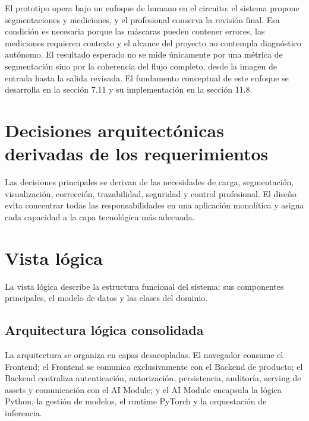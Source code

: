 
El prototipo opera bajo un enfoque de humano en el circuito: el sistema propone segmentaciones y mediciones, y el profesional conserva la revisión final. Esa condición es necesaria porque las máscaras pueden contener errores, las mediciones requieren contexto y el alcance del proyecto no contempla diagnóstico autónomo. El resultado esperado no se mide únicamente por una métrica de segmentación sino por la coherencia del flujo completo, desde la imagen de entrada hasta la salida revisada. El fundamento conceptual de este enfoque se desarrolla en la sección 7.11 y su implementación en la sección 11.8.

\section{Decisiones arquitectónicas derivadas de los requerimientos}

Las decisiones principales se derivan de las necesidades de carga, segmentación, visualización, corrección, trazabilidad, seguridad y control profesional. El diseño evita concentrar todas las responsabilidades en una aplicación monolítica y asigna cada capacidad a la capa tecnológica más adecuada.


\section{Vista lógica}

La vista lógica describe la estructura funcional del sistema: sus componentes principales, el modelo de datos y las clases del dominio.

\subsection{Arquitectura lógica consolidada}

La arquitectura se organiza en capas desacopladas. El navegador consume el Frontend; el Frontend se comunica exclusivamente con el Backend de producto; el Backend centraliza autenticación, autorización, persistencia, auditoría, serving de assets y comunicación con el AI Module; y el AI Module encapsula la lógica Python, la gestión de modelos, el runtime PyTorch y la orquestación de inferencia.

